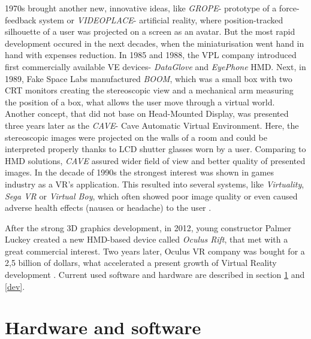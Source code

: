 1970s brought another new, innovative ideas, like \textit{GROPE}- prototype of a force-feedback system or \textit{VIDEOPLACE}- artificial reality, where position-tracked silhouette of a user was projected on a screen as an avatar. But the most rapid development occured in the next decades, when the miniaturisation went hand in hand with expenses reduction. In 1985 and 1988, the VPL company introduced first commercially available VE devices- \textit{DataGlove} and \textit{EyePhone} HMD. Next, in 1989, Fake Space Labs manufactured \textit{BOOM}, which was a small box with two CRT monitors creating the stereoscopic view and a mechanical arm measuring the position of a box, what allows the user move through a virtual world. Another concept, that did not base on Head-Mounted Display, was presented three years later as the \textit{CAVE}- Cave Automatic Virtual Environment. Here, the stereoscopic images were projected on the walls of a room and could be interpreted properly thanks to LCD shutter glasses worn by a user. Comparing to HMD solutions, \textit{CAVE} assured wider field of view and better quality of presented images. In the decade of 1990s the strongest interest was shown in games industry as a VR's application. This resulted into several systems, like \textit{Virtuality}, \textit{Sega VR} or \textit{Virtual Boy}, which often showed poor image quality or even caused adverse health effects (nausea or headache) to the user \cite{Olszewski15, Mandal13}. 

After the strong 3D graphics development, in 2012, young constructor Palmer Luckey created a new HMD-based device called \textit{Oculus Rift}, that met with a great commercial interest. Two years later, Oculus VR company was bought for a 2,5 billion of dollars, what accelerated a present growth of Virtual Reality development \cite{Olszewski15}. Current used software and hardware are described in section \ref{har} and \ref{dev}.
 
\section{Hardware and software}\label{har}%

